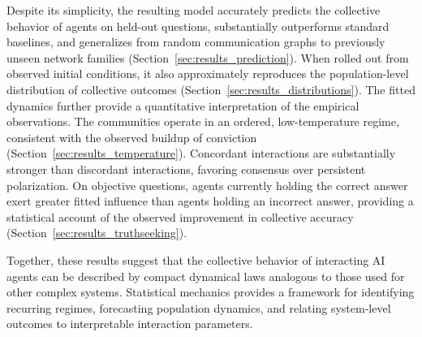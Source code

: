 Despite its simplicity, the resulting model accurately predicts the collective behavior of agents on held-out questions, substantially outperforms standard baselines, and generalizes from random communication graphs to previously unseen network families (Section~\ref{sec:results_prediction}). When rolled out from observed initial conditions, it also approximately reproduces the population-level distribution of collective outcomes (Section~\ref{sec:results_distributions}). The fitted dynamics further provide a quantitative interpretation of the empirical observations. The communities operate in an ordered, low-temperature regime, consistent with the observed buildup of conviction (Section~\ref{sec:results_temperature}). Concordant interactions are substantially stronger than discordant interactions, favoring consensus over persistent polarization. On objective questions, agents currently holding the correct answer exert greater fitted influence than agents holding an incorrect answer, providing a statistical account of the observed improvement in collective accuracy (Section~\ref{sec:results_truthseeking}).

Together, these results suggest that the collective behavior of interacting AI agents can be described by compact dynamical laws analogous to those used for other complex systems. Statistical mechanics provides a framework for identifying recurring regimes, forecasting population dynamics, and relating system-level outcomes to interpretable interaction parameters.
















